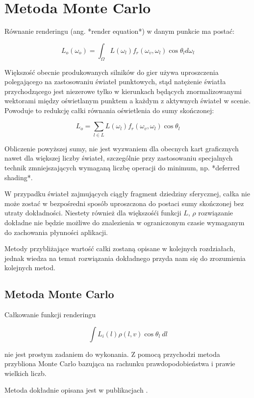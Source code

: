 \documentclass[../main.tex]{subfiles}
\begin{document}
\chapter{Metoda Monte Carlo}

Równanie renderingu (ang. *render equation*) w danym punkcie ma postać:

$$
L_o(\omega_o) = \int_{\Omega} {
    L(\omega_{l})
    f_r(\omega_{v}, \omega_{l})
    \cos \theta_{l}
    d\omega_{l}
}
$$

Większość obecnie produkowanych silników do gier używa uproszczenia
polegającego na zastosowaniu świateł punktowych, stąd natężenie światła
przychodzącego jest niezerowe tylko w kierunkach będących znormalizowanymi
wektorami między oświetlanym punktem a każdym z aktywnych świateł w scenie.
Powoduje to redukcję całki równania oświetlenia do sumy skończonej:

$$ L_o = \sum_{l \in L} L(\omega_l) f_r(\omega_v, \omega_l)\cos \theta_l $$

Obliczenie powyższej sumy, nie jest wyzwaniem dla obecnych kart graficznych
nawet dla większej liczby świateł, szczególnie przy zastosowaniu specjalnych
technik zmniejszających wymaganą liczbę operacji do minimum, np. *deferred
shading*.

W przypadku świateł zajmujących ciągły fragment dziedziny sferycznej, całka nie
może zostać w bezpośredni sposób uproszczona do postaci sumy skończonej bez
utraty dokładności. Niestety również dla większośći funkcji $L$, $\rho$
rozwiązanie dokładne nie będzie możliwe do znalezienia w ograniczonym czasie
wymaganym do zachowania płynności aplikacji.

Metody przybliżające wartość całki zostaną opisane w kolejnych rozdziałach,
jednak wiedza na temat rozwiązania dokładnego przyda nam się do zrozumienia
kolejnych metod.

\section{Metoda Monte Carlo}

Całkowanie funkcji renderingu

$$
\int{
    L_i(l)
    \rho(l,v)
    \cos \theta_{l}
    \:dl
} $$

nie jest prostym zadaniem do wykonania. Z pomocą przychodzi metoda przybliona
Monte Carlo bazująca na rachunku prawdopodobieństwa i prawie wielkich liczb.

Metoda dokładnie opisana jest w publikacjach \cite{MonteCarloAnderson}
\cite{Veach}.
\end{document}
